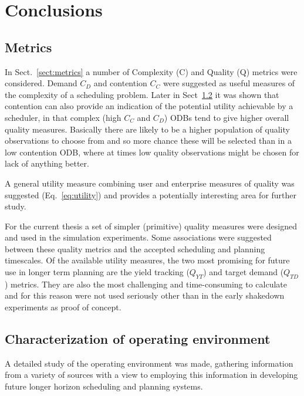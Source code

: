 \section{Conclusions}
\label{sect:conclusions}



\subsection{Metrics}
 In Sect.~\ref{sect:metrics} a number of Complexity (C) and Quality (Q) metrics were considered. Demand $C_D$ and contention $C_C$ were suggested as useful measures of the complexity of a scheduling problem. Later in Sect~\ref{}  it was shown that contention can also provide an indication of the potential utility achievable by a scheduler, in that complex (high $C_C$ and $C_D$) ODBs tend to give higher overall quality measures. Basically there are likely to be a higher population of quality observations to choose from and so more chance these will be selected than in a low contention ODB, where at times low quality observations might be chosen for lack of anything better.

 A general utility measure combining user and enterprise measures of quality was suggested (Eq.~\ref{eq:utility}) and provides a potentially interesting area for further study. 

For the current thesis a set of simpler (primitive) quality measures were designed and used in the simulation experiments. Some associations were suggested between these quality metrics and the accepted scheduling and planning timescales. Of the available utility measures, the two most promising for future use in longer term planning are the yield tracking ($Q_{YT}$) and target demand ($Q_{TD}$) metrics. They are also the most challenging and time-consuming to calculate and for this reason were not used seriously other than in the early shakedown experiments as proof of concept. 

\subsection{Characterization of operating environment}
 A detailed study of the operating environment was made, gathering information from a variety of sources with a view to employing this information in developing future longer horizon scheduling and planning systems. 

